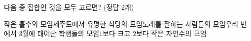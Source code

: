 다음 중 집합인 것을 모두 고르면? (정답 $2$개)
\begin{choicesv}{작은 홀수의 모임}{제주도에서 유명한 식당의 모임}{노래를 잘하는 사람들의 모임}{우리 반에서 $3$월에 태어난 학생들의 모임}{$1$보다 크고 $2$보다 작은 자연수의 모임}\end{choicesv}
